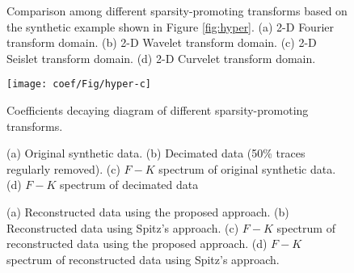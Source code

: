 \begin{figure}[htb!]
  \centering
	\caption{Comparison among different sparsity-promoting transforms based on the synthetic example shown in Figure \ref{fig:hyper}. (a) 2-D Fourier transform domain. (b) 2-D Wavelet transform domain. (c) 2-D Seislet transform domain. (d) 2-D Curvelet transform domain.}
   \label{fig:hyper-fk,hyper-dwt,hyper-seis,hyper-curv-img}
\end{figure}

\begin{figure}[htb!]
  \centering
    \texttt{[image: coef/Fig/hyper-c]}
	\caption{Coefficients decaying diagram of different sparsity-promoting transforms.}
   \label{fig:hyper-c}
\end{figure}

\begin{figure}[htb!]
  \centering
	\caption{(a) Original synthetic data. (b) Decimated data (50\% traces regularly removed). (c) $F-K$ spectrum of original synthetic data. (d)  $F-K$ spectrum of decimated data }
   \label{fig:hyper,hyper-zero,fk-hyper,fk-hyper-zero}
\end{figure}

\begin{figure}[htb!]
  \centering
	\caption{(a) Reconstructed data using the proposed approach. (b) Reconstructed data using Spitz's approach. (c)  $F-K$ spectrum of reconstructed data using the proposed approach. (d)  $F-K$ spectrum of reconstructed data using Spitz's approach. }
   \label{fig:hyper-seiss,hyper-fx,fk-hyper-seis,fk-hyper-fx}
\end{figure}


